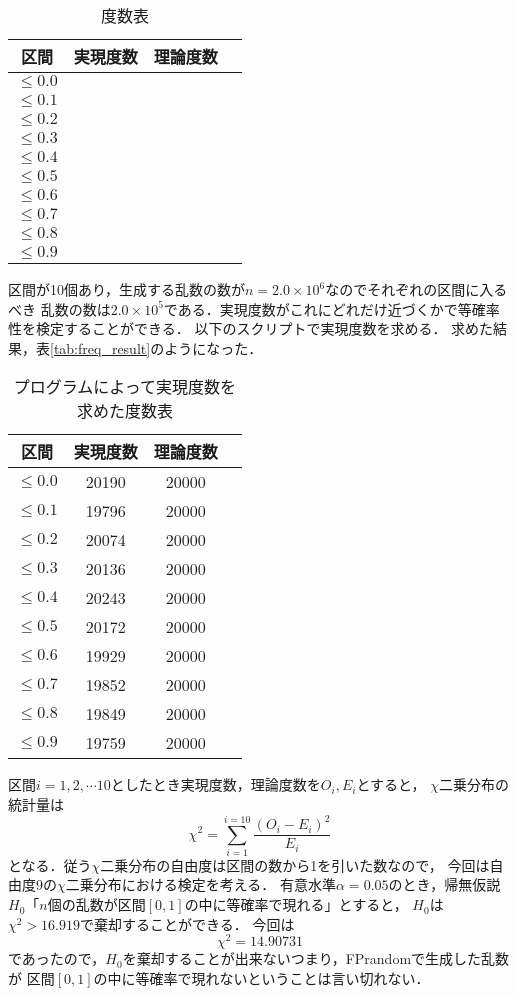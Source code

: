 \begin{table}[htbp]
\centering
\caption{度数表}
\label{tab:freq}
\begin{tabular}{|c|c|c|c|}
\hline
区間            & 実現度数 & 理論度数  \\ \hline
$\leq 0.0$ &      &  \\ \hline
$\leq 0.1$ &      &  \\ \hline
$\leq 0.2$ &      &  \\ \hline
$\leq 0.3$ &      &  \\ \hline
$\leq 0.4$ &      &  \\ \hline
$\leq 0.5$ &      &  \\ \hline
$\leq 0.6$ &      &  \\ \hline
$\leq 0.7$ &      &  \\ \hline
$\leq 0.8$ &      &  \\ \hline
$\leq 0.9$ &      &  \\ \hline
\end{tabular}
\end{table}

区間が10個あり，生成する乱数の数が$n = 2.0 \times 10^6$なのでそれぞれの区間に入るべき
乱数の数は$2.0\times 10^5$である．実現度数がこれにどれだけ近づくかで等確率性を検定することができる．
以下のスクリプトで実現度数を求める．
{
}
求めた結果，表\ref{tab:freq_result}のようになった．
\begin{table}[htbp]
\centering
\caption{プログラムによって実現度数を求めた度数表}
\label{tab:freq}
\begin{tabular}{|c|c|c|c|}
\hline
区間            & 実現度数 & 理論度数 \\ \hline
$\leq 0.0$ &   20190   &  20000  \\ \hline
$\leq 0.1$ &   19796   &  20000  \\ \hline
$\leq 0.2$ &   20074   &  20000  \\ \hline
$\leq 0.3$ &   20136   &  20000  \\ \hline
$\leq 0.4$ &   20243   &  20000  \\ \hline
$\leq 0.5$ &   20172   &  20000  \\ \hline
$\leq 0.6$ &   19929   &  20000  \\ \hline
$\leq 0.7$ &   19852   &  20000  \\ \hline
$\leq 0.8$ &   19849   &  20000  \\ \hline
$\leq 0.9$ &   19759   &  20000  \\ \hline
\end{tabular}
\end{table}
区間$i = 1,2,\cdots10$としたとき実現度数，理論度数を$O_i,E_i$とすると，
$\chi$二乗分布の統計量は
\[
\chi^2 = \sum_{i=1}^{i = 10}\dfrac{(O_i - E_i)^2}{E_i}
\]
となる．従う$\chi$二乗分布の自由度は区間の数から1を引いた数なので，
今回は自由度9の$\chi$二乗分布における検定を考える．
有意水準$\alpha = 0.05$のとき，帰無仮説$H_0$「$n$個の乱数が区間$[0,1]$の中に等確率で現れる」とすると，
$H_0$は$\chi^2 > 16.919$で棄却することができる．
今回は
\[
\chi^2 = 14.90731
\]
であったので，$H_0$を棄却することが出来ないつまり，FPrandomで生成した乱数が
区間$[0,1]$の中に等確率で現れないということは言い切れない．

